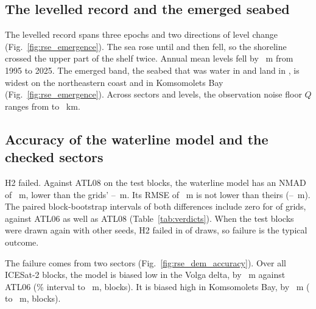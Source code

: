 
\subsection{The levelled record and the emerged seabed}
\label{sec:res_record}
The levelled record spans three epochs and two directions of level change (Fig.~\ref{fig:rse_emergence}). The sea rose until  and then fell, so the shoreline crossed the upper part of the shelf twice. Annual mean levels fell by ~m from 1995 to 2025. The emerged band, the seabed that was water in  and land in , is widest on the northeastern coast and in Komsomolets Bay (Fig.~\ref{fig:rse_emergence}). Across sectors and levels, the observation noise floor $Q$ ranges from  to ~km.



\subsection{Accuracy of the waterline model and the checked sectors}
\label{sec:res_dem}
H2 failed. Against ATL08 on the test blocks, the waterline model has an NMAD of ~m, lower than the grids' --~m. Its RMSE of ~m is not lower than theirs (--~m). The paired block-bootstrap intervals of both differences include zero for  of  grids, against ATL06 as well as ATL08 (Table~\ref{tab:verdicts}). When the test blocks were drawn again with other seeds, H2 failed in  of  draws, so failure is the typical outcome.

The failure comes from two sectors (Fig.~\ref{fig:rse_dem_accuracy}). Over all ICESat-2 blocks, the model is biased low in the Volga delta, by ~m against ATL06 (\% interval  to ~m,  blocks). It is biased high in Komsomolets Bay, by ~m ( to ~m,  blocks).

